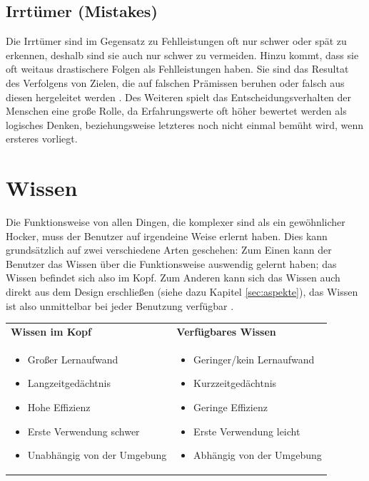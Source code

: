 \documentclass[parskip,headsepline, headtopline, %
footsepline, oneside, 12pt, headings=small]{scrreprt}
\begin{document}
\subsection{Irrtümer (Mistakes)}

Die Irrtümer sind im Gegensatz zu Fehlleistungen oft nur schwer oder spät zu erkennen, deshalb sind sie auch nur schwer zu vermeiden. Hinzu kommt, dass sie oft weitaus drastischere Folgen als Fehlleistungen haben. Sie sind das Resultat des Verfolgens von Zielen, die auf falschen Prämissen beruhen oder falsch aus diesen hergeleitet werden \cite[S. 114]{don}. Des Weiteren spielt das Entscheidungsverhalten der Menschen eine große Rolle, da Erfahrungswerte oft höher bewertet werden als logisches Denken, beziehungsweise letzteres noch nicht einmal bemüht wird, wenn ersteres vorliegt.

\section{Wissen}

Die Funktionsweise von allen Dingen, die komplexer sind als ein gewöhnlicher Hocker, muss der Benutzer auf irgendeine Weise erlernt haben. Dies kann grundsätzlich auf zwei verschiedene Arten geschehen: Zum Einen kann der Benutzer das Wissen über die Funktionsweise auswendig gelernt haben; das Wissen befindet sich also im Kopf. Zum Anderen kann sich das Wissen auch direkt aus dem Design erschließen (siehe dazu Kapitel \ref{sec:aspekte}), das Wissen ist also unmittelbar bei jeder Benutzung verfügbar \cite[S. 54ff]{don}. 

\begin{tabular}{p{}p{}}\vspace{6pt}
\hspace{1cm}\textbf{Wissen im Kopf} & \vspace{6pt}\hspace{1cm}\textbf{Verfügbares Wissen}\\
\begin{itemize}
\item Großer Lernaufwand
\item Langzeitgedächtnis
\item Hohe Effizienz
\item Erste Verwendung schwer
\item Unabhängig von der Umgebung
\end{itemize} &
\begin{itemize}
\item Geringer/kein Lernaufwand
\item Kurzzeitgedächtnis
\item Geringe Effizienz
\item Erste Verwendung leicht
\item Abhängig von der Umgebung
\end{itemize}
\\
\end{tabular}
\end{document}
